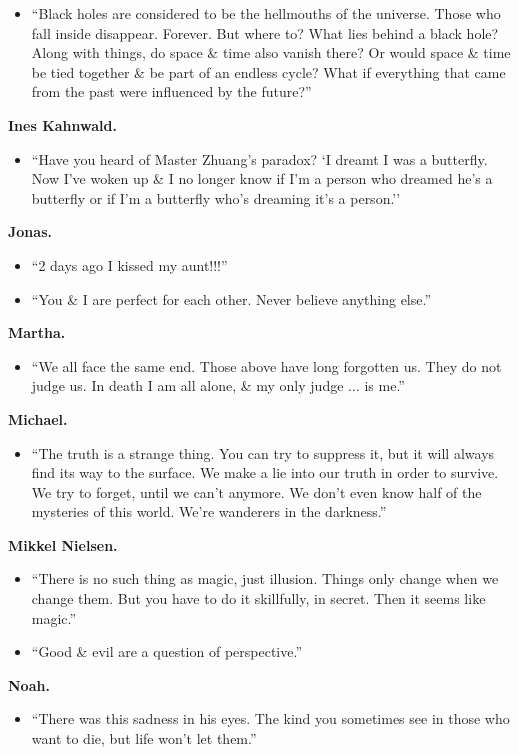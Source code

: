 \documentclass{article}
\begin{document}
\begin{enumerate}
\begin{itemize}
		\item ``Black holes are considered to be the hellmouths of the universe. Those who fall inside disappear. Forever. But where to? What lies behind a black hole? Along with things, do space \& time also vanish there? Or would space \& time be tied together \& be part of an endless cycle? What if everything that came from the past were influenced by the future?''
	\end{itemize}
	\textbf{Ines Kahnwald.}
	\begin{itemize}
		\item ``Have you heard of Master Zhuang's paradox? `I dreamt I was a butterfly. Now I've woken up \& I no longer know if I'm a person who dreamed he's a butterfly or if I'm a butterfly who's dreaming it's a person.''
	\end{itemize}
	\textbf{Jonas.}
	\begin{itemize}
		\item ``2 days ago I kissed my aunt!!!''
		\item ``You \& I are perfect for each other. Never believe anything else.''
	\end{itemize}
	\textbf{Martha.}
	\begin{itemize}
		\item ``We all face the same end. Those above have long forgotten us. They do not judge us. In death I am all alone, \& my only judge $\ldots$ is me.''
	\end{itemize}
	\textbf{Michael.}
	\begin{itemize}
		\item ``The truth is a strange thing. You can try to suppress it, but it will always find its way to the surface. We make a lie into our truth in order to survive. We try to forget, until we can't anymore. We don't even know half of the mysteries of this world. We're wanderers in the darkness.''
	\end{itemize}
	\textbf{Mikkel Nielsen.}
	\begin{itemize}
		\item ``There is no such thing as magic, just illusion. Things only change when we change them. But you have to do it skillfully, in secret. Then it seems like magic.''
		\item ``Good \& evil are a question of perspective.''
	\end{itemize}
	\textbf{Noah.}
	\begin{itemize}
		\item ``There was this sadness in his eyes. The kind you sometimes see in those who want to die, but life won't let them.''

\end{itemize}
\end{enumerate}
\end{document}
